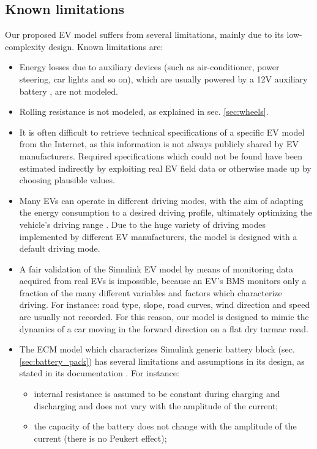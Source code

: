 \subsection{Known limitations}
\label{sec:known_limitations}
Our proposed EV model suffers from several limitations, mainly due to its low-complexity design. Known limitations are:
\begin{itemize}
    \item Energy losses due to auxiliary devices (such as air-conditioner, power steering, car lights and so on), which are usually powered by a 12V auxiliary battery \cite{auxiliary_battery}, are not modeled.
    \item Rolling resistance is not modeled, as explained in sec. \ref{sec:wheels}.
    \item It is often difficult to retrieve technical specifications of a specific EV model from the Internet, as this information is not always publicly shared by EV manufacturers. Required specifications which could not be found have been estimated indirectly by exploiting real EV field data or otherwise made up by choosing plausible values.
    \item Many EVs can operate in different driving modes, with the aim of adapting the energy consumption to a desired driving profile, ultimately optimizing the vehicle's driving range \cite{vw_driving_modes}. Due to the huge variety of driving modes implemented by different EV manufacturers, the model is designed with a default driving mode.
    \item A fair validation of the Simulink EV model by means of monitoring data acquired from real EVs is impossible, because an EV's BMS monitors only a fraction of the many different variables and factors which characterize driving. For instance: road type, slope, road curves, wind direction and speed are usually not recorded. For this reason, our model is designed to mimic the dynamics of a car moving in the forward direction on a flat dry tarmac road.
    \item The ECM model which characterizes Simulink generic battery block (sec. \ref{sec:battery_pack}) has several limitations and assumptions in its design, as stated in its documentation \cite{mathworks:battery}. For instance:
    \begin{itemize}
        \item internal resistance is assumed to be constant during charging and discharging and does not vary with the amplitude of the current;
        \item the capacity of the battery does not change with the amplitude of the current (there is no Peukert effect);

\end{itemize}
\end{itemize}
